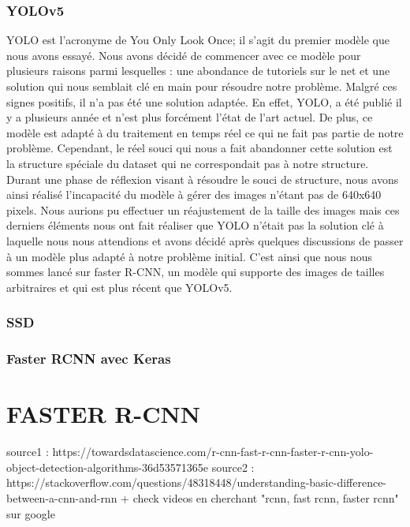 \subsubsection{YOLOv5}
YOLO est l'acronyme de You Only Look Once; il s'agit du premier modèle que nous avons essayé. Nous avons décidé de commencer avec ce modèle pour plusieurs raisons parmi lesquelles : une abondance de tutoriels sur le net et une solution qui nous semblait clé en main pour résoudre notre problème. Malgré ces signes positifs, il n’a pas été une solution adaptée. \newline
En effet, YOLO, a été publié il y a plusieurs année et n’est plus forcément l’état de l’art actuel. De plus, ce modèle est adapté à du traitement en temps réel ce qui ne fait pas partie de notre problème. Cependant, le réel souci qui nous a fait abandonner cette solution est la structure spéciale du dataset qui ne correspondait pas à notre structure. \newline 
Durant une phase de réflexion visant à résoudre le souci de structure, nous avons ainsi réalisé l’incapacité du modèle à gérer des images n’étant pas de 640x640 pixels. Nous aurions pu effectuer un réajustement de la taille des images mais ces derniers éléments nous ont fait réaliser que YOLO n’était pas la solution clé à laquelle nous nous attendions et avons décidé après quelques discussions de passer à un modèle plus adapté à notre problème initial. C'est ainsi que nous nous sommes lancé sur faster R-CNN, un modèle qui supporte des images de tailles arbitraires et qui est plus récent que YOLOv5.

\subsubsection{SSD}

\subsubsection{Faster RCNN avec Keras}


\section{FASTER R-CNN}

source1 : https://towardsdatascience.com/r-cnn-fast-r-cnn-faster-r-cnn-yolo-object-detection-algorithms-36d53571365e \newline\newline
source2 : https://stackoverflow.com/questions/48318448/understanding-basic-difference-between-a-cnn-and-rnn \newline\newline
+ check videos en cherchant "rcnn, fast rcnn, faster rcnn" sur google






